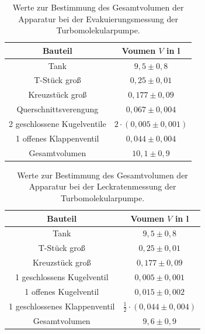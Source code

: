 \begin{table}[H]
\centering
\caption{Werte zur Bestimmung des Gesamtvolumen der Apparatur bei der Evakuierungsmessung der Turbomolekularpumpe.}
\label{tab:Volumen_ET}
\begin{tabular}{c|c}
Bauteil & Voumen $V$ in l\\
\hline
Tank &$9,5 \pm 0,8$\\
T-Stück groß &$0,25 \pm 0,01$\\
Kreuzstück groß&$0,177 \pm 0,09$\\
Querschnittsverengung&$0,067 \pm 0,004$\\
2 geschlossene Kugelventile&$ 2 \cdot(0,005 \pm 0,001)$\\
1 offenes Klappenventil&$0,044 \pm 0,004$\\
\hline
Gesamtvolumen&$10,1 \pm 0,9$\\
\end{tabular}
\end{table}

\begin{table}[H]
\centering
\caption{Werte zur Bestimmung des Gesamtvolumen der Apparatur bei der Leckratenmessung der Turbomolekularpumpe.}
\label{tab:Volumen_LT}
\begin{tabular}{c|c}
Bauteil & Voumen $V$ in l\\
\hline
Tank &$9,5 \pm 0,8$\\
T-Stück groß &$0,25 \pm 0,01$\\
Kreuzstück groß&$0,177 \pm 0,09$\\
1 geschlossens Kugelventil&$0,005 \pm 0,001$\\
1 offenes Kugelventil&$0,015 \pm 0,002$\\
1 geschlossenes Klappenventil&$\frac{1}{2}\cdot(0,044 \pm 0,004)$\\
\hline
Gesamtvolumen&$ 9,6 \pm 0,9$\\
\end{tabular}
\end{table}

